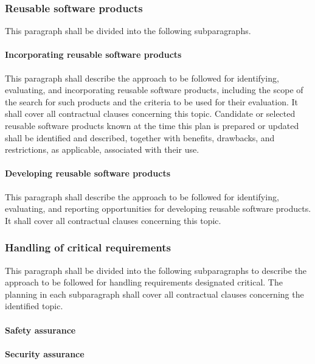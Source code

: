 \documentclass{fidata-report-template}
\begin{document}
\subsubsection{Reusable software products}

This paragraph shall be divided into the following subparagraphs.

\paragraph{Incorporating reusable software products}

This paragraph shall describe the approach to be followed for
identifying, evaluating, and incorporating reusable software products,
including the scope of the search for such products and the criteria to
be used for their evaluation. It shall cover all contractual clauses
concerning this topic. Candidate or selected reusable software products
known at the time this plan is prepared or updated shall be identified
and described, together with benefits, drawbacks, and restrictions, as
applicable, associated with their use.

\paragraph{Developing reusable software products}

This paragraph shall describe the approach to be followed for
identifying, evaluating, and reporting opportunities for developing
reusable software products. It shall cover all contractual clauses
concerning this topic.

\subsubsection{Handling of critical requirements}

This paragraph shall be divided into the following subparagraphs to
describe the approach to be followed for handling requirements
designated critical. The planning in each subparagraph shall cover all
contractual clauses concerning the identified topic.

\paragraph{Safety assurance}

\paragraph{Security assurance}
\end{document}
